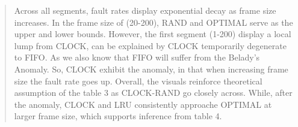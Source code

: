 \documentclass[a4paper, 11pt]{report}
\begin{document}
    \begin{flushright}
        \vspace{0.5cm}
        \begin{minipage}[t]{0.5\linewidth}
            \begin{quote}
                Across all segments, fault rates display exponential decay as frame size increases. In the frame size of (20-200), RAND and OPTIMAL serve as
                the upper and lower bounds. However, the first segment (1-200) display a local lump from CLOCK,
                can be explained by CLOCK temporarily degenerate to FIFO\cite{cornelluni}. As we also know that FIFO will suffer from the Belady's Anomaly. So,
                CLOCK exhibit the anomaly, in that when increasing frame size the fault rate goes 
                up\cite{ostep2018}. Overall, the visuals reinforce theoretical assumption of the table 3 as CLOCK-RAND go closely across. 
                While, after the anomaly, CLOCK and LRU consistently approache OPTIMAL at larger frame size, which supports inference from table 4.
            \end{quote}
        \end{minipage}
    \end{flushright}
    \begin{figure}[H]
        
    \end{figure}
\newpage
\end{document}

